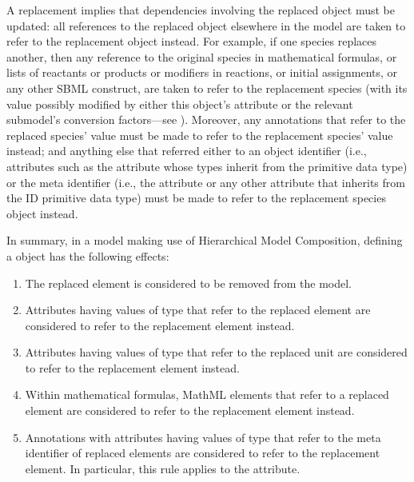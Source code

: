 A replacement implies that dependencies involving the replaced object must be updated: all references to the replaced object elsewhere in the model are taken to refer to the replacement object instead.  For example, if one species replaces another, then any reference to the original species in mathematical formulas, or lists of reactants or products or modifiers in reactions, or initial assignments, or any other SBML construct, are taken to refer to the replacement species (with its value possibly modified by either this object's  attribute or the relevant submodel's conversion factors---see ). Moreover, any annotations that refer to the replaced species'  value must be made to refer to the replacement species'  value instead; and anything else that referred either to an object identifier (i.e., attributes such as the  attribute whose types inherit from the  primitive data type) or the meta identifier (i.e., the  attribute or any other attribute that inherits from the ID primitive data type) must be made to refer to the replacement species object instead.

In summary, in a \sbmlthreecore model making use of Hierarchical Model Composition, defining a \ReplacedElement object has the following effects:

\begin{enumerate}


\item The replaced element is considered to be removed from the model.

\item Attributes having values of type  that refer to the replaced element are considered to refer to the replacement element instead.

\item Attributes having values of type  that refer to the replaced unit are considered to refer to the replacement element instead.

\item Within mathematical formulas, MathML  elements that refer to a replaced element are considered to refer to the replacement element instead.

\item Annotations with attributes having values of type  that refer to the meta identifier of replaced elements are considered to refer to the replacement element. In particular, this rule applies to the  attribute.

\end{enumerate}

